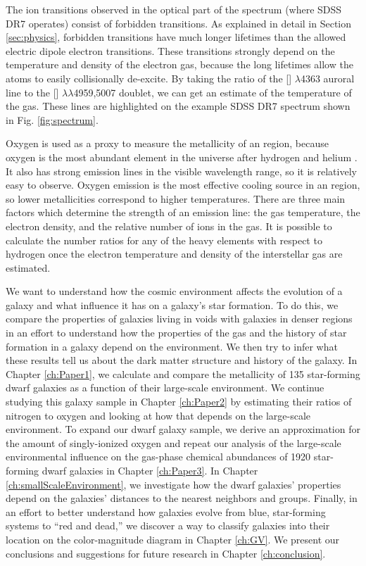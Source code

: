 The ion transitions observed in the optical part of the spectrum (where SDSS DR7 
operates) consist of forbidden transitions.  As explained in detail in Section 
\ref{sec:physics}, forbidden transitions have much longer lifetimes than the 
allowed electric dipole electron transitions.  These transitions strongly depend 
on the temperature and density of the electron gas, because the long lifetimes 
allow the atoms to easily collisionally de-excite.  By taking the ratio of the 
[] $\lambda$4363 auroral line to the [] 
$\lambda \lambda$4959,5007 doublet, we can get an estimate of the temperature of 
the gas.  These lines are highlighted on the example SDSS DR7 spectrum shown in 
Fig. \ref{fig:spectrum}.  

Oxygen is used as a proxy to measure the metallicity of an  region, 
because oxygen is the most abundant element in the universe after hydrogen and 
helium \citep{Emsley11}.  It also has strong emission lines in the visible 
wavelength range, so it is relatively easy to observe.  Oxygen emission is the 
most effective cooling source in an  region, so lower metallicities 
correspond to higher temperatures.  There are three main factors which determine 
the strength of an emission line: the gas temperature, the electron density, and 
the relative number of ions in the gas.  It is possible to calculate the number 
ratios for any of the heavy elements with respect to hydrogen once the electron 
temperature and density of the interstellar gas are estimated.


We want to understand how the cosmic environment affects the evolution of a 
galaxy and what influence it has on a galaxy's star formation.  To do this, we 
compare the properties of galaxies living in voids with galaxies in denser 
regions in an effort to understand how the properties of the gas and the history 
of star formation in a galaxy depend on the environment.  We then try to infer 
what these results tell us about the dark matter structure and history of the 
galaxy.  In Chapter \ref{ch:Paper1}, we calculate and compare the metallicity of 
135 star-forming dwarf galaxies as a function of their large-scale environment.  
We continue studying this galaxy sample in Chapter \ref{ch:Paper2} by estimating 
their ratios of nitrogen to oxygen and looking at how that depends on the 
large-scale environment.  To expand our dwarf galaxy sample, we derive an 
approximation for the amount of singly-ionized oxygen and repeat our analysis of 
the large-scale environmental influence on the gas-phase chemical abundances of 
1920 star-forming dwarf galaxies in Chapter \ref{ch:Paper3}.  In Chapter 
\ref{ch:smallScaleEnvironment}, we investigate how the dwarf galaxies' 
properties depend on the galaxies' distances to the nearest neighbors and 
groups.  Finally, in an effort to better understand how galaxies evolve from 
blue, star-forming systems to ``red and dead,'' we discover a way to classify 
galaxies into their location on the color-magnitude diagram in Chapter 
\ref{ch:GV}.  We present our conclusions and suggestions for future research in 
Chapter \ref{ch:conclusion}.